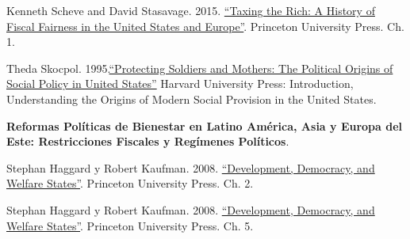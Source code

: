 \documentclass[letterpaper]{article}
\renewenvironment{itemize}{
  \begin{list}{}{
    \setlength{\leftmargin}{1.5em}
  }
}{
  \end{list}
}
\begin{document}
\begin{enumerate}[label=\roman*.]
\begin{itemize}
\begin{itemize}
          \item[$\circ$] Kenneth Scheve and David Stasavage. 2015. \href{https://github.com/hbahamonde/Ciencia_Politica_II/raw/master/Readings/Taxing_The_Rich.pdf}{``Taxing the Rich: A History of Fiscal Fairness in the United States and Europe''}. Princeton University Press. Ch. 1.
					
         
          
          \item[$\circ$] Theda Skocpol. 1995.\href{https://github.com/hbahamonde/Ciencia_Politica_II/raw/master/Readings/Skocpol_1995.pdf}{``Protecting Soldiers and Mothers: The Political Origins of Social Policy in United States''} Harvard University Press: Introduction, Understanding the Origins of Modern Social Provision in the United States.



				\end{itemize}


			\item[18.] {\bf Reformas Pol\'iticas de Bienestar en Latino Am\'erica, Asia y Europa del Este: Restricciones Fiscales y Reg\'imenes Pol\'iticos}.
				\begin{itemize}
					\item[$\circ$] Stephan Haggard y Robert Kaufman. 2008. \href{https://github.com/hbahamonde/Ciencia_Politica_II/raw/master/Readings/Kaufman_Welfare.pdf}{``Development, Democracy, and Welfare States''}. Princeton University Press. Ch. 2.

          \item[$\circ$] Stephan Haggard y Robert Kaufman. 2008. \href{https://github.com/hbahamonde/Ciencia_Politica_II/raw/master/Readings/Kaufman_Welfare.pdf}{``Development, Democracy, and Welfare States''}. Princeton University Press. Ch. 5.

        \end{itemize}



\end{itemize}
\end{enumerate}
\end{document}
